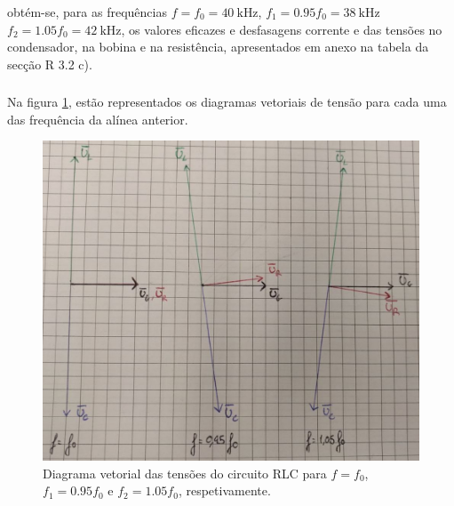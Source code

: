 \documentclass[a4paper, titlepage, portuguese]{article}
\begin{document}
		 obtém-se, para as frequências $f = f_0 = \SI{40}{\kilo\hertz}$, $f_1 = 0.95f_0= \SI{38}{\kilo\hertz}$ $f_2 = 1.05f_0 = \SI{42}{\kilo\hertz}$, os valores eficazes e desfasagens corrente e das tensões no condensador, na bobina e na resistência, apresentados em anexo na tabela da secção R 3.2 c).

	\newpage
	\subsubsection{}

		Na figura \ref{fig:diag_vect}, estão representados os diagramas vetoriais de tensão para cada uma das frequência da alínea anterior.

		\begin{figure}[h]
			\centering
			\includegraphics[width=0.6\linewidth]{diag_vect.jpeg}
			\caption{Diagrama vetorial das tensões do circuito RLC para $f=f_0$, $f_1=0.95f_0$ e $f_2=1.05f_0$, respetivamente.}
			\label{fig:diag_vect}
		\end{figure}


\end{document}
